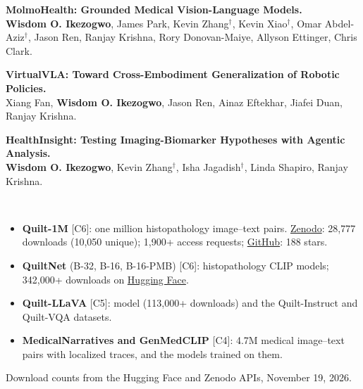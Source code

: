 \documentclass[10pt,letterpaper]{article}
\newcommand{\cvsec}[1]{\vspace{3.2mm}{\large\scshape\bfseries #1}\,\hrulefill\par\vspace{1.6mm}}
\newcommand{\cvsub}[1]{\vspace{1.5mm}{\scshape\bfseries #1}\par\vspace{0.5mm}}
\newcommand{\me}{\textbf{Wisdom O. Ikezogwo}}
\newcommand{\mt}[1]{#1$^\dagger$}   %
\begin{document}
\cvsub{In Preparation}
\begin{pubs}
  \item[{[P1]}] \textbf{MolmoHealth: Grounded Medical Vision-Language Models.}\\
  \me, James Park, \mt{Kevin Zhang}, \mt{Kevin Xiao}, \mt{Omar Abdel-Aziz}, Jason Ren, Ranjay Krishna, Rory Donovan-Maiye, Allyson Ettinger, Chris Clark.
  \item[{[P2]}] \textbf{VirtualVLA: Toward Cross-Embodiment Generalization of Robotic Policies.}\\
  Xiang Fan, \me, Jason Ren, Ainaz Eftekhar, Jiafei Duan, Ranjay Krishna.
  \item[{[P3]}] \textbf{HealthInsight: Testing Imaging-Biomarker Hypotheses with Agentic Analysis.}\\
  \me, \mt{Kevin Zhang}, \mt{Isha Jagadish}, Linda Shapiro, Ranjay Krishna.
\end{pubs}

\cvsec{Datasets, Models \& Software}
\begin{itemize}[leftmargin=1.4em,itemsep=2pt,topsep=2pt]
  \item \textbf{Quilt-1M} [C6]: one million histopathology image--text pairs. \href{https://zenodo.org/record/8239942}{Zenodo}: 28{,}777 downloads (10{,}050 unique); 1{,}900+ access requests; \href{https://github.com/wisdomikezogwo/quilt1m}{GitHub}: 188 stars.
  \item \textbf{QuiltNet} (B-32, B-16, B-16-PMB) [C6]: histopathology CLIP models; 342{,}000+ downloads on \href{https://huggingface.co/wisdomik}{Hugging Face}.
  \item \textbf{Quilt-LLaVA} [C5]: model (113{,}000+ downloads) and the Quilt-Instruct and Quilt-VQA datasets.
  \item \textbf{MedicalNarratives and GenMedCLIP} [C4]: 4.7M medical image--text pairs with localized traces, and the models trained on them.
\end{itemize}
{\small\color{black!60} Download counts from the Hugging Face and Zenodo APIs, November 19, 2026.}
\end{document}
